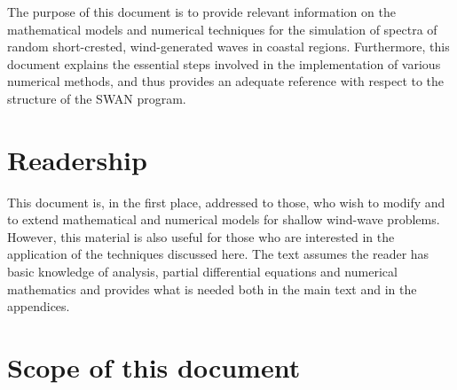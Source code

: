 \documentclass[12pt]{book}
\begin{document}
The purpose of this document is to provide relevant information on the mathematical models and numerical techniques for
the simulation of spectra of random short-crested, wind-generated waves in coastal regions. Furthermore, this document
explains the essential steps involved in the implementation of various numerical methods, and thus provides an adequate
reference with respect to the structure of the SWAN program.

\section{Readership} \label{sec:read}

This document is, in the first place, addressed to those, who wish to modify and to extend mathematical and numerical
models for shallow wind-wave problems. However, this material is also useful for those who are interested in the application
of the techniques discussed here. The text assumes the reader has basic knowledge of analysis, partial differential
equations and numerical mathematics and provides what is needed both in the main text and in the appendices.

\section{Scope of this document} \label{sec:scope}
\end{document}
